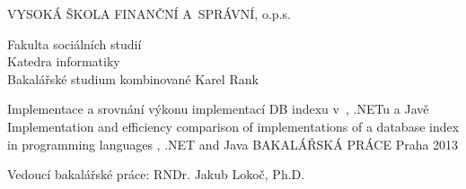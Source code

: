 \begin{titlepage}
\begin{center}
{\Large VYSOKÁ ŠKOLA FINANČNÍ A~SPRÁVNÍ, o.p.s.}

{\large Fakulta sociálních studií\\
Katedra informatiky\\
Bakalářské studium kombinované}
\vfill
{\Large Karel Rank\\[1in]}

{\large Implementace a srovnání výkonu implementací DB indexu v~\CC, .NETu a Javě\\
Implementation and efficiency comparison of implementations of a database index in programming languages \CC, .NET and Java}
\vfill
{\Large BAKALÁŘSKÁ PRÁCE}
\vfill
{\large Praha 2013}

\end{center}
{\large Vedoucí bakalářské práce: RNDr. Jakub Lokoč, Ph.D.}
\end{titlepage}